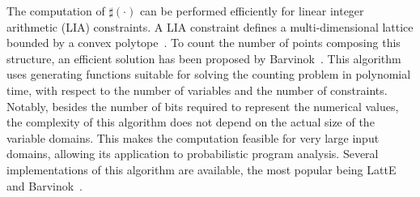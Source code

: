 The computation of $\sharp(\cdot)$ can be performed efficiently for linear integer arithmetic (LIA) constraints.
A LIA constraint defines a multi-dimensional lattice bounded by a convex polytope~\cite{de2008computationalGeometry}. To count the number of points composing this structure, an efficient solution has been proposed by Barvinok~\cite{barvinok1994polynomial}. This algorithm uses generating functions suitable for solving the counting problem in polynomial time, with respect to the number of variables and the number of constraints. Notably, besides the number of bits required to represent the numerical values, the complexity of this algorithm does not depend on the actual size of the variable domains. This makes the computation feasible for very large input domains, allowing its application to probabilistic program analysis\cite{Geldenhuys2012,Filieri2013,Filieri2015}. Several implementations of this algorithm are available, the most popular being LattE~\cite{LattESoftware} and Barvinok~\cite{verdoolaegesoftware}. 


